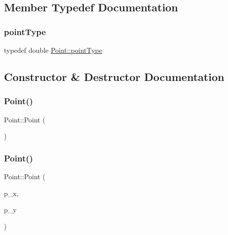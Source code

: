\subsection{Member Typedef Documentation}
\mbox{\label{class_point_a00b37528c0db634a12ecee9b29d79579}} 
\subsubsection{\texorpdfstring{point\+Type}{pointType}}
{\footnotesize\ttfamily typedef double \hyperlink{class_point_a00b37528c0db634a12ecee9b29d79579}{Point\+::point\+Type}}



\subsection{Constructor \& Destructor Documentation}
\mbox{\label{class_point_ad92f2337b839a94ce97dcdb439b4325a}} 
\subsubsection{\texorpdfstring{Point()}{Point()}\hspace{0.1cm}{\footnotesize\ttfamily [1/2]}}
{\footnotesize\ttfamily Point\+::\+Point (\begin{DoxyParamCaption}{ }\end{DoxyParamCaption})}

\mbox{\label{class_point_a4246ef6d69a6d29d1b9d1e225a9db964}} 
\subsubsection{\texorpdfstring{Point()}{Point()}\hspace{0.1cm}{\footnotesize\ttfamily [2/2]}}
{\footnotesize\ttfamily Point\+::\+Point (\begin{DoxyParamCaption}\item[{\hyperlink{class_point_a00b37528c0db634a12ecee9b29d79579}{point\+Type}}]{p\+\_\+x,  }\item[{\hyperlink{class_point_a00b37528c0db634a12ecee9b29d79579}{point\+Type}}]{p\+\_\+y }\end{DoxyParamCaption})}



